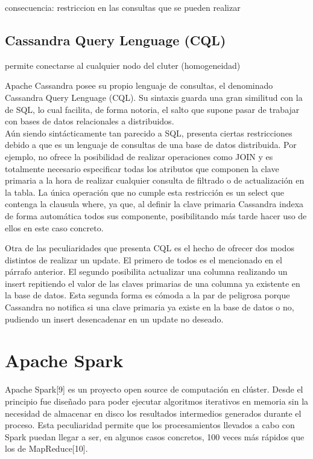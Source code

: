 consecuencia: restriccion en las consultas que se pueden realizar

\subsection{Cassandra Query Lenguage (CQL)}

permite conectarse al cualquier nodo del cluter (homogeneidad)

Apache Cassandra posee su propio lenguaje de consultas, el denominado Cassandra Query Lenguage (CQL). Su sintaxis guarda una gran similitud con la de SQL, lo cual facilita, de forma notoria, el salto que supone pasar de trabajar con bases de datos relacionales a distribuidos.\\

Aún siendo sintácticamente  tan parecido a SQL, presenta ciertas restricciones debido a que es un lenguaje de consultas de una base de datos distribuida. Por ejemplo, no ofrece la posibilidad de realizar operaciones como JOIN y es totalmente necesario especificar todas los atributos que componen la clave primaria a la hora de realizar cualquier consulta de filtrado o de actualización en la tabla. La única operación que no cumple esta restricción es un select que contenga la clausula where, ya que, al definir la clave primaria Cassandra indexa de forma automática todos sus componente, posibilitando más tarde  hacer uso de ellos en este caso concreto.

Otra de las peculiaridades que presenta CQL es el hecho de ofrecer dos modos distintos de realizar un update. El primero de todos es el mencionado en el párrafo anterior. El segundo posibilita actualizar una columna realizando un insert repitiendo el valor de las claves primarias de una columna ya existente en la base de datos. Esta segunda forma es cómoda a la par de peligrosa porque Cassandra no notifica si una clave primaria ya existe en la base de datos o no, pudiendo un insert desencadenar en un update no deseado.  

\section{Apache Spark}

Apache Spark[9] es un proyecto open source de computación en clúster. Desde el principio fue diseñado para poder ejecutar algoritmos iterativos en memoria sin la necesidad de almacenar en disco los resultados intermedios generados durante el proceso. Esta peculiaridad permite que los procesamientos llevados a cabo con Spark puedan llegar a ser, en algunos casos concretos, 100 veces más rápidos que los de MapReduce[10].\\

